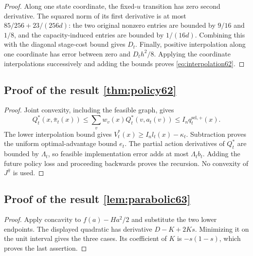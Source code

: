 \begin{proof}
Along one state coordinate, the fixed-$u$ transition has zero second derivative. The squared norm of its first derivative is at most $85/256+23/(256d)$: the two original nonzero entries are bounded by $9/16$ and $1/8$, and the capacity-induced entries are bounded by $1/(16d)$. Combining this with the diagonal stage-cost bound gives $D_t$. Finally, positive interpolation along one coordinate has error between zero and $D_t h^2/8$. Applying the coordinate interpolations successively and adding the bounds proves \eqref{eq:interpolation62}.
\end{proof}

\subsection{Proof of the result \ref{thm:policy62}}\label{supp:proof-accuracy62-print-2}
\begin{proof}
Joint convexity, including the feasible graph, gives
\[
 Q_t^*(x,\bar\pi_t(x))\le\sum_vw_v(x)Q_t^*(v,a_t(v))
       \le I_nq_t^{\mathrm{sel},+}(x).
\]
The lower interpolation bound gives $V_t^*(x)\ge I_nl_t(x)-\kappa_t$. Subtraction proves the uniform optimal-advantage bound $e_t$. The partial action derivatives of $Q_t^*$ are bounded by $\Lambda_t$, so feasible implementation error adds at most $\Lambda_tb_t$. Adding the future policy loss and proceeding backwards proves the recursion. No convexity of $J^{\widehat\pi}$ is used.
\end{proof}

\subsection{Proof of the result \ref{lem:parabolic63}}\label{supp:proof-query63-1}
\begin{proof}
Apply concavity to $f(a)-Ha^2/2$ and substitute the two lower endpoints. The displayed quadratic has derivative $D-K+2Ks$. Minimizing it on the unit interval gives the three cases. Its coefficient of $K$ is $-s(1-s)$, which proves the last assertion.
\end{proof}

